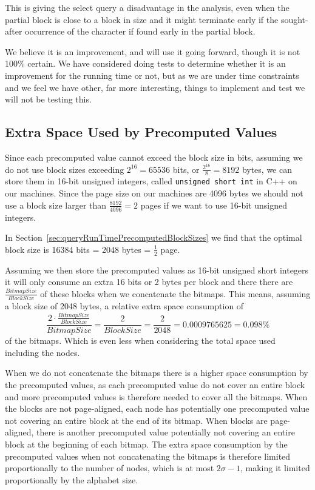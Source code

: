 This is giving the select query a disadvantage in the analysis, even when the partial block is close to a block in size and it might terminate early if the sought-after occurrence of the character if found early in the partial block.

We believe it is an improvement, and will use it going forward, though it is not 100\% certain.
We have considered doing tests to determine whether it is an improvement for the running time or not, but as we are under time constraints and we feel we have other, far more interesting, things to implement and test we will not be testing this.



\subsection{Extra Space Used by Precomputed Values}
Since each precomputed value cannot exceed the block size in bits, assuming we do not use block sizes exceeding $2^{16} = 65536$ bits, or $\frac{2^{16}}{8} = 8192$ bytes, we can store them in 16-bit unsigned integers, called \texttt{unsigned short int} in C++ on our machines.
Since the page size on our machines are 4096 bytes we should not use a block size larger than $\frac{8192}{4096} = 2$ pages if we want to use 16-bit unsigned integers.

In Section~\ref{sec:queryRunTimePrecomputedBlockSizes} we find that the optimal block size is 16384 bits = 2048 bytes = $\frac{1}{2}$ page.

Assuming we then store the precomputed values as 16-bit unsigned short integers it will only consume an extra 16 bits or 2 bytes per block and there there are $\frac{BitmapSize}{BlockSize}$ of these blocks when we concatenate the bitmaps.
This means, assuming a block size of 2048 bytes, a relative extra space consumption of
\[ \frac{ 2 \cdot \frac{BitmapSize}{BlockSize} }{BitmapSize} = \frac{2}{BlockSize} = \frac{2}{2048} = 0.0009765625 = 0.098\% \]
of the bitmaps.
Which is even less when considering the total space used including the nodes.

When we do not concatenate the bitmaps there is a higher space consumption by the precomputed values, as each precomputed value do not cover an entire block and more precomputed values is therefore needed to cover all the bitmaps.
When the blocks are not page-aligned, each node has potentially one precomputed value not covering an entire block at the end of its bitmap.
When blocks are page-aligned, there is another precomputed value potentially not covering an entire block at the beginning of each bitmap.
The extra space consumption by the precomputed values when not concatenating the bitmaps is therefore limited proportionally to the number of nodes, which is at most $2 \sigma - 1$, making it limited proportionally by the alphabet size.

